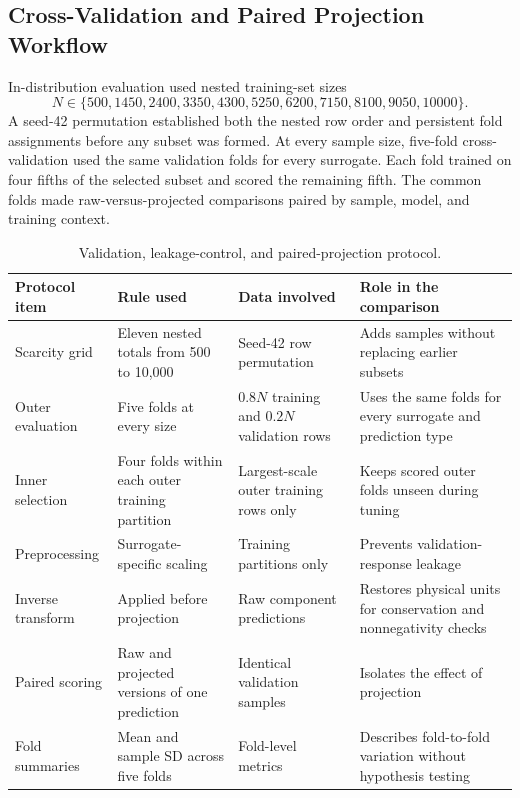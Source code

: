 \documentclass[12pt, twoside]{book}
\begin{document}
\subsection{Cross-Validation and Paired Projection Workflow}

In-distribution evaluation used nested training-set sizes
\begin{equation}
\label{eq:ch2_sample_grid}
N\in\{500,1450,2400,3350,4300,5250,6200,7150,8100,9050,10000\}.
\end{equation}
A seed-42 permutation established both the nested row order and persistent fold assignments before any subset
was formed. At every sample size, five-fold cross-validation used the same validation folds for every
surrogate. Each fold trained on four fifths of the selected subset and scored the remaining fifth. The common
folds made raw-versus-projected comparisons paired by sample, model, and training context.

\begin{table}[htbp]
\centering
\caption{Validation, leakage-control, and paired-projection protocol.}
\label{tab:ch2_validation_protocol}
\scriptsize
\setlength{\tabcolsep}{3pt}
\begin{tabular}{p{2.7cm}p{3.3cm}p{3.1cm}p{3.7cm}}
\toprule
Protocol item & Rule used & Data involved & Role in the comparison \\
\midrule
Scarcity grid & Eleven nested totals from 500 to 10,000 & Seed-42 row permutation & Adds samples without replacing earlier subsets \\
Outer evaluation & Five folds at every size & \(0.8N\) training and \(0.2N\) validation rows & Uses the same folds for every surrogate and prediction type \\
Inner selection & Four folds within each outer training partition & Largest-scale outer training rows only & Keeps scored outer folds unseen during tuning \\
Preprocessing & Surrogate-specific scaling & Training partitions only & Prevents validation-response leakage \\
Inverse transform & Applied before projection & Raw component predictions & Restores physical units for conservation and nonnegativity checks \\
Paired scoring & Raw and projected versions of one prediction & Identical validation samples & Isolates the effect of projection \\
Fold summaries & Mean and sample SD across five folds & Fold-level metrics & Describes fold-to-fold variation without hypothesis testing \\
\bottomrule
\end{tabular}
\end{table}
\end{document}
